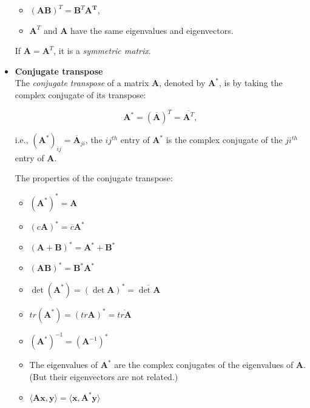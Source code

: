 \documentclass[10pt,b5paper,titlepage]{book}
\begin{document}
\begin{itemize}
\begin{itemize}
            \item $(\mathbf{A}\mathbf{B})^{T} = \mathbf{B}^{T}\mathbf{A^{T}}$,

            \item $\mathbf{A}^{T}$ and $\mathbf{A}$ have the same eigenvalues
                and eigenvectors.
        \end{itemize}

        If $\mathbf{A} = \mathbf{A}^{T}$, it is a \textit{symmetric matrix}.

    \item \textbf{Conjugate transpose}\\

        The \textit{conjugate transpose} of a matrix $\mathbf{A}$, denoted by
        $\mathbf{A}^{*}$, is by taking the complex conjugate of its transpose:

        \begin{equation}
            \mathbf{A}^{*} = (\overline{\mathbf{A}})^{T} = \overline{\mathbf{A}^{T}}
        ,\end{equation}

        i.e., $(\mathbf{A}^{*})_{ij} = \overline{\mathbf{A}}_{ji}$, the $ij^{th}$
        entry of $\mathbf{A}^{*}$ is the complex conjugate of the $ji^{th}$ entry
        of $\mathbf{A}$.

        The properties of the conjugate transpose:

        \begin{itemize}
            \item $(\mathbf{A}^{*})^{*} = \mathbf{A}$
            \item $(c \mathbf{A})^{*} = \overline{c}\mathbf{A}^{*}$
            \item $(\mathbf{A} + \mathbf{B})^{*} = \mathbf{A}^{*} + \mathbf{B}^{*}$
            \item $(\mathbf{A}\mathbf{B})^{*} = \mathbf{B}^{*}\mathbf{A}^{*}$
            \item $\det(\mathbf{A}^{*}) = (\det \mathbf{A})^{*} = \overline{\det \mathbf{A}}$
            \item $tr(\mathbf{A}^{*}) = (tr \mathbf{A})^{*} = \overline{tr \mathbf{A}}$
            \item $(\mathbf{A^{*}})^{-1} = (\mathbf{A}^{-1})^{*}$
            \item The eigenvalues of $\mathbf{A}^{*}$ are the complex conjugates
                of the eigenvalues of $\mathbf{A}$. (But their eigenvectors are
                not related.)
            \item $\langle \mathbf{A}\mathbf{x}, \mathbf{y} \rangle = \langle \mathbf{x}, \mathbf{A}^{*}\mathbf{y} \rangle$
        \end{itemize}


\end{itemize}
\end{document}
